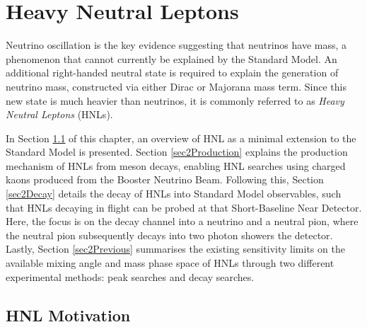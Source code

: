 
\chapter{Heavy Neutral Leptons}

\ifpdf
    \graphicspath{{Chapter2/Figs/Raster/}{Chapter2/Figs/PDF/}{Chapter2/Figs/}}
\else
    \graphicspath{{Chapter2/Figs/Vector/}{Chapter2/Figs/}}
\fi


Neutrino oscillation is the key evidence suggesting that neutrinos have mass, a phenomenon that cannot currently be explained by the Standard Model.
An additional right-handed neutral state is required to explain the generation of neutrino mass, constructed via either Dirac or Majorana mass term.
Since this new state is much heavier than neutrinos, it is commonly referred to as \textit{Heavy Neutral Leptons} (HNLs).

In Section \ref{sec2Overview} of this chapter, an overview of HNL as a minimal extension to the Standard Model is presented.
Section \ref{sec2Production} explains the production mechanism of HNLs from meson decays, enabling HNL searches using charged kaons produced from the Booster Neutrino Beam.
Following this, Section \ref{sec2Decay} details the decay of HNLs into Standard Model observables, such that HNLs decaying in flight can be probed at that Short-Baseline Near Detector. 
Here, the focus is on the decay channel into a neutrino and a neutral pion, where the neutral pion subsequently decays into two photon showers the detector.
Lastly, Section \ref{sec2Previous} summarises the existing sensitivity limits on the available mixing angle and mass phase space of HNLs through two different experimental methods: peak searches and decay searches.

\newpage
\section{HNL Motivation}
\label{sec2Overview}


